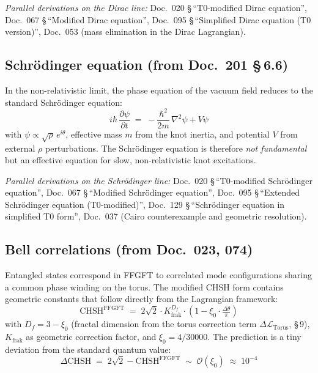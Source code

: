 \textit{Parallel derivations on the Dirac line:}
Doc.~020 \S\,\enquote{T0-modified Dirac equation},
Doc.~067 \S\,\enquote{Modified Dirac equation},
Doc.~095 \S\,\enquote{Simplified Dirac equation (T0 version)},
Doc.~053 (mass elimination in the Dirac Lagrangian).

\subsection*{Schrödinger equation (from Doc.~201 \S\,6.6)}

In the non-relativistic limit, the phase equation of the vacuum field
reduces to the standard Schrödinger equation:
\begin{equation}
  i\hbar\,\frac{\partial\psi}{\partial t}
  \;=\; -\frac{\hbar^{2}}{2m}\,\nabla^{2}\psi + V\psi
  \tag{202.\,QM-4}
\end{equation}
with $\psi \propto \sqrt{\rho}\,e^{i\theta}$, effective mass $m$ from
the knot inertia, and potential $V$ from external $\rho$ perturbations.
The Schrödinger equation is therefore \emph{not fundamental} but an
effective equation for slow, non-relativistic knot excitations.

\textit{Parallel derivations on the Schrödinger line:}
Doc.~020 \S\,\enquote{T0-modified Schrödinger equation},
Doc.~067 \S\,\enquote{Modified Schrödinger equation},
Doc.~095 \S\,\enquote{Extended Schrödinger equation (T0-modified)},
Doc.~129 \S\,\enquote{Schrödinger equation in simplified T0 form},
Doc.~037 (Cairo counterexample and geometric resolution).

\subsection*{Bell correlations (from Doc.~023, 074)}

Entangled states correspond in FFGFT to correlated mode configurations
sharing a common phase winding on the torus. The modified CHSH form
contains geometric constants that follow directly from the Lagrangian
framework:
\begin{equation}
  \mathrm{CHSH}^{\mathrm{FFGFT}}
  \;=\; 2\sqrt{2}\cdot K_{\text{frak}}^{D_f}\cdot
        \left(1 - \xi_0\cdot\tfrac{\Delta\theta}{\pi}\right)
  \tag{202.\,QM-5}
\end{equation}
with $D_f = 3 - \xi_0$ (fractal dimension from the torus correction
term $\Delta\mathcal{L}_{\text{Torus}}$, \S\,9), $K_{\text{frak}}$ as
geometric correction factor, and $\xi_0 = 4/30000$. The prediction is
a tiny deviation from the standard quantum value:
\begin{equation}
  \Delta\mathrm{CHSH} \;=\; 2\sqrt{2} - \mathrm{CHSH}^{\mathrm{FFGFT}}
  \;\sim\; \mathcal{O}(\xi_0)\;\approx\; 10^{-4}
  \tag{202.\,QM-6}
\end{equation}

